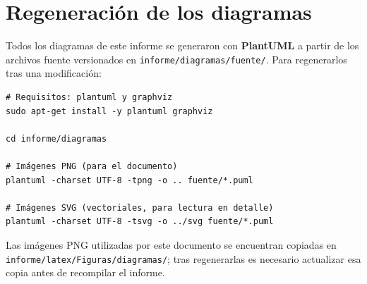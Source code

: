 \chapter{Regeneración de los diagramas}
\label{anexo:diagramas}

Todos los diagramas de este informe se generaron con \textbf{PlantUML}
\parencite{plantuml_sf} a partir de los archivos fuente versionados en
\texttt{informe/diagramas/fuente/}. Para regenerarlos tras una modificación:

\begin{verbatim}
# Requisitos: plantuml y graphviz
sudo apt-get install -y plantuml graphviz

cd informe/diagramas

# Imágenes PNG (para el documento)
plantuml -charset UTF-8 -tpng -o .. fuente/*.puml

# Imágenes SVG (vectoriales, para lectura en detalle)
plantuml -charset UTF-8 -tsvg -o ../svg fuente/*.puml
\end{verbatim}

Las imágenes PNG utilizadas por este documento se encuentran copiadas en
\texttt{informe/latex/Figuras/diagramas/}; tras regenerarlas es necesario actualizar esa copia
antes de recompilar el informe.

